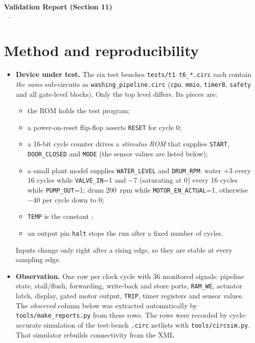 \documentclass[10pt,a4paper]{article}
\begin{document}
\begin{center}
{\Large\textbf{Validation Report (Section 11)}}\\[2pt]
\project\ -- \course
\end{center}

\section{Method and reproducibility}
\begin{itemize}
\item \textbf{Device under test.} The six test benches \texttt{tests/t1}--\texttt{t6\_*.circ} each contain \emph{the same}
  sub-circuits as \texttt{washing\_pipeline.circ} (\texttt{cpu}, \texttt{mmio}, \texttt{timer8}, \texttt{safety} and all gate-level
  blocks). Only the top level differs. Its pieces are:
  \begin{itemize}
  \item the ROM holds the test program;
  \item a power-on-reset flip-flop asserts \texttt{RESET} for cycle 0;
  \item a 16-bit cycle counter drives a \emph{stimulus ROM} that supplies \texttt{START}, \texttt{DOOR\_CLOSED} and
    \texttt{MODE} (the sensor values are listed below);
  \item a small plant model supplies \texttt{WATER\_LEVEL} and \texttt{DRUM\_RPM}: water $+3$ every 16 cycles while
    \texttt{VALVE\_IN}=1 and $-7$ (saturating at 0) every 16 cycles while \texttt{PUMP\_OUT}=1; drum 200~rpm while
    \texttt{MOTOR\_EN\_ACTUAL}=1, otherwise $-40$ per cycle down to 0;
  \item \texttt{TEMP} is the constant ;
  \item an output pin \texttt{halt} stops the run after a fixed number of cycles.
  \end{itemize}
  Inputs change only right after a rising edge, so they are stable at every sampling edge.
\item \textbf{Observation.} One row per clock cycle with 36 monitored signals: pipeline state, stall/flush, forwarding,
  write-back and store ports, \texttt{RAM\_WE}, actuator latch, display, gated motor output, \texttt{TRIP}, timer
  registers and sensor values. The \emph{observed} column below was extracted automatically by
  \texttt{tools/make\_reports.py} from these rows. The rows were recorded by cycle-accurate simulation of the
  test-bench \texttt{.circ} netlists with \texttt{tools/circsim.py}. That simulator rebuilds connectivity from the XML

\end{itemize}
\end{document}
